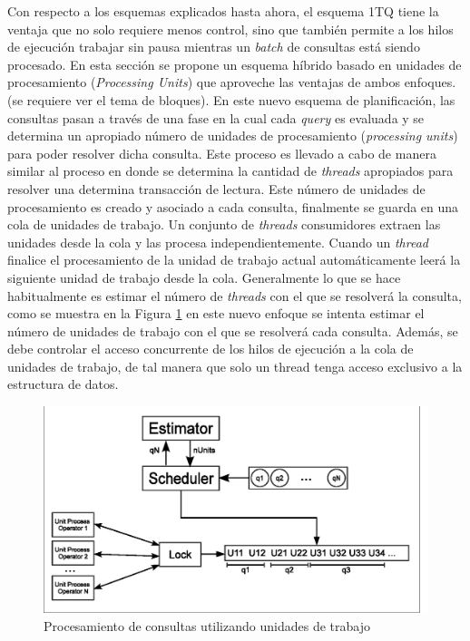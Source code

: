Con respecto a los esquemas explicados hasta ahora, el esquema 1TQ tiene la ventaja que no solo requiere menos control, sino que también permite a los hilos de ejecución trabajar sin pausa mientras un \textit{batch} de consultas está siendo procesado. En esta sección se propone un esquema híbrido basado en unidades de procesamiento (\textit{Processing Units}) que aproveche las ventajas de ambos enfoques. (se requiere ver el tema de bloques).
En este nuevo esquema de planificación, las consultas pasan a través de una fase en la cual cada \textit{query} es evaluada y se determina un apropiado número de unidades de procesamiento (\textit{processing units}) para poder resolver dicha consulta. Este proceso es llevado a cabo de manera similar al proceso en donde se determina la cantidad de \textit{threads} apropiados para resolver una determina transacción de lectura. Este número de unidades de procesamiento es creado y asociado a cada consulta, finalmente se guarda en una cola de unidades de trabajo. Un conjunto de \textit{threads} consumidores extraen las unidades desde la cola y las procesa independientemente. Cuando un \textit{thread} finalice el procesamiento de la unidad de trabajo actual automáticamente leerá la siguiente unidad de trabajo desde la cola. 
Generalmente lo que se hace habitualmente es estimar el número de \textit{threads} con el que se resolverá la consulta, como se muestra en la Figura \ref{fig:unit_process} en este nuevo enfoque se intenta estimar el número de unidades de trabajo con el que se resolverá cada consulta. Además, se debe controlar el acceso concurrente de los hilos de ejecución a la cola de unidades de trabajo, de tal manera que solo un thread tenga acceso exclusivo a la estructura de datos. 

\begin{figure}[!th]
\centering
\includegraphics[scale=.75]{images/unit_process.eps}
\caption{Procesamiento de consultas utilizando unidades de trabajo}
\label{fig:unit_process}
\end{figure}

